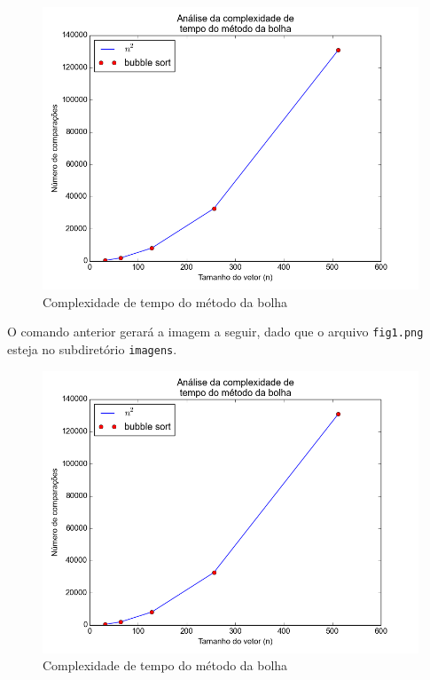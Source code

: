 \documentclass[12pt,a4paper,twoside]{report}
\begin{document}
\begin{latex}
\begin{figure}[!ht]
\centering
\includegraphics[scale=0.5]{imagens/bolha1.png}
\caption{Complexidade de tempo do método da bolha \label{fig:1}}
\end{figure}
\end{latex}

O comando anterior gerará a imagem a seguir, dado que o arquivo \texttt{fig1.png} esteja no subdiretório \texttt{imagens}.
\begin{figure}[!h]
\centering
\includegraphics[scale=0.5]{imagens/bolha1.png}
\caption{Complexidade de tempo do método da bolha \label{fig:1}}
\end{figure}
\end{document}
